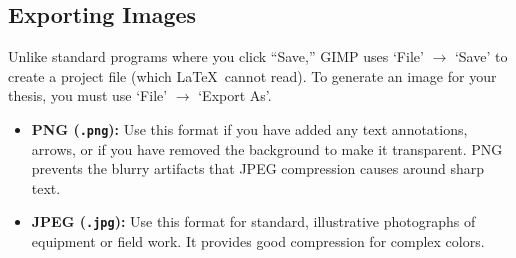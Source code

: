 		\subsection{Exporting Images}
			Unlike standard programs where you click \enquote{Save,} GIMP uses `File' \(\rightarrow\) `Save' to create a  project file (which \LaTeX\ cannot read). 
			To generate an image for your thesis, you must use `File' \(\rightarrow\) `Export As'.

			\begin{itemize}
				\item \textbf{PNG (\texttt{.png}):} Use this format if you have added any text annotations, arrows, or if you have removed the background to make it transparent. 
					PNG prevents the blurry artifacts that JPEG compression causes around sharp text.
				\item \textbf{JPEG (\texttt{.jpg}):} Use this format for standard, illustrative photographs of equipment or field work. 
					It provides good compression for complex colors.
			\end{itemize}